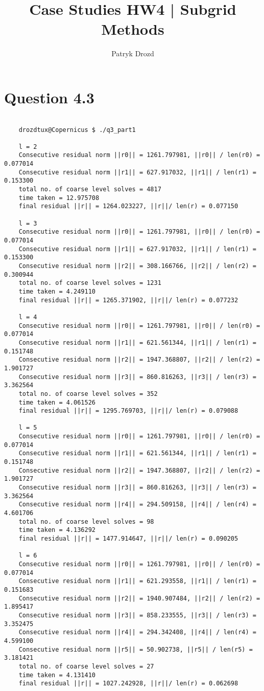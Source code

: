 \documentclass[a4paper]{article}
\title{Case Studies HW4 | Subgrid Methods}
\author{Patryk Drozd}
\begin{document}
\date{}
\maketitle

\section{Question 4.3}
			
	

\begin{verbatim}

	drozdtux@Copernicus $ ./q3_part1

	l = 2
	Consecutive residual norm ||r0|| = 1261.797981, ||r0|| / len(r0) = 0.077014
	Consecutive residual norm ||r1|| = 627.917032, ||r1|| / len(r1) = 0.153300
	total no. of coarse level solves = 4817
	time taken = 12.975708
	final residual ||r|| = 1264.023227, ||r||/ len(r) = 0.077150

	l = 3
	Consecutive residual norm ||r0|| = 1261.797981, ||r0|| / len(r0) = 0.077014
	Consecutive residual norm ||r1|| = 627.917032, ||r1|| / len(r1) = 0.153300
	Consecutive residual norm ||r2|| = 308.166766, ||r2|| / len(r2) = 0.300944
	total no. of coarse level solves = 1231
	time taken = 4.249110
	final residual ||r|| = 1265.371902, ||r||/ len(r) = 0.077232

	l = 4
	Consecutive residual norm ||r0|| = 1261.797981, ||r0|| / len(r0) = 0.077014
	Consecutive residual norm ||r1|| = 621.561344, ||r1|| / len(r1) = 0.151748
	Consecutive residual norm ||r2|| = 1947.368807, ||r2|| / len(r2) = 1.901727
	Consecutive residual norm ||r3|| = 860.816263, ||r3|| / len(r3) = 3.362564
	total no. of coarse level solves = 352
	time taken = 4.061526
	final residual ||r|| = 1295.769703, ||r||/ len(r) = 0.079088

	l = 5
	Consecutive residual norm ||r0|| = 1261.797981, ||r0|| / len(r0) = 0.077014
	Consecutive residual norm ||r1|| = 621.561344, ||r1|| / len(r1) = 0.151748
	Consecutive residual norm ||r2|| = 1947.368807, ||r2|| / len(r2) = 1.901727
	Consecutive residual norm ||r3|| = 860.816263, ||r3|| / len(r3) = 3.362564
	Consecutive residual norm ||r4|| = 294.509158, ||r4|| / len(r4) = 4.601706
	total no. of coarse level solves = 98
	time taken = 4.136292
	final residual ||r|| = 1477.914647, ||r||/ len(r) = 0.090205

	l = 6
	Consecutive residual norm ||r0|| = 1261.797981, ||r0|| / len(r0) = 0.077014
	Consecutive residual norm ||r1|| = 621.293558, ||r1|| / len(r1) = 0.151683
	Consecutive residual norm ||r2|| = 1940.907484, ||r2|| / len(r2) = 1.895417
	Consecutive residual norm ||r3|| = 858.233555, ||r3|| / len(r3) = 3.352475
	Consecutive residual norm ||r4|| = 294.342408, ||r4|| / len(r4) = 4.599100
	Consecutive residual norm ||r5|| = 50.902738, ||r5|| / len(r5) = 3.181421
	total no. of coarse level solves = 27
	time taken = 4.131410
	final residual ||r|| = 1027.242928, ||r||/ len(r) = 0.062698

\end{verbatim}
\end{document}
